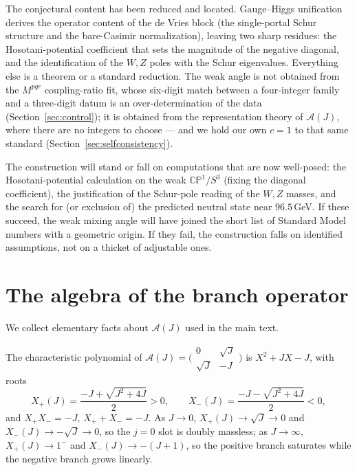 \documentclass[11pt]{article}
\theoremstyle{plain}
\theoremstyle{definition}
\newcommand{\cA}{\mathcal{A}}
\newcommand{\Xp}{X_{+}}
\newcommand{\Xm}{X_{-}}
\begin{document}
The conjectural content has been reduced and located. Gauge--Higgs
unification derives the operator content of the de Vries block (the
single-portal Schur structure and the bare-Casimir normalization), leaving two
sharp residues: the Hosotani-potential coefficient that sets the magnitude of
the negative diagonal, and the identification of the $W,Z$ poles with the
Schur eigenvalues. Everything else is a theorem or a standard reduction. The
weak angle is not obtained from the $M^{pqr}$ coupling-ratio fit, whose
six-digit match between a four-integer family and a three-digit datum is an
over-determination of the data (Section~\ref{sec:control}); it is obtained
from the representation theory of $\cA(J)$, where there are no integers to
choose --- and we hold our own $c=1$ to that same standard
(Section~\ref{sec:selfconsistency}).

The construction will stand or fall on computations that are now well-posed:
the Hosotani-potential calculation on the weak $\mathbb{CP}^1/S^3$ (fixing the
diagonal coefficient), the justification of the Schur-pole reading of the
$W,Z$ masses, and the search for (or exclusion of) the predicted neutral state
near $96.5\,$GeV. If these succeed, the weak mixing angle will have joined the
short list of Standard Model numbers with a geometric origin. If they fail,
the construction falls on identified assumptions, not on a thicket of
adjustable ones.

\appendix

\section{The algebra of the branch operator}
\label{app:algebra}

We collect elementary facts about $\cA(J)$ used in the main text.

The characteristic polynomial of $\cA(J)=\bigl(\begin{smallmatrix}0&\sqrt
J\\\sqrt J&-J\end{smallmatrix}\bigr)$ is $X^2+JX-J$, with roots
\begin{equation}
\Xp(J)=\frac{-J+\sqrt{J^2+4J}}{2}>0,\qquad
\Xm(J)=\frac{-J-\sqrt{J^2+4J}}{2}<0,
\end{equation}
and $\Xp\Xm=-J$, $\Xp+\Xm=-J$. As $J\to0$, $\Xp(J)\to\sqrt J\to0$ and
$\Xm(J)\to-\sqrt J\to0$, so the $j=0$ slot is doubly massless; as
$J\to\infty$, $\Xp(J)\to1^-$ and $\Xm(J)\to-(J+1)$, so the positive branch
saturates while the negative branch grows linearly.
\end{document}
